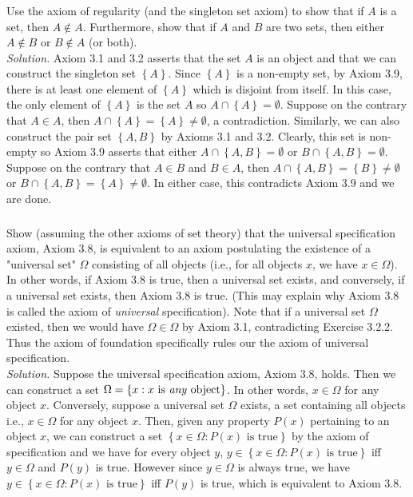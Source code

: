 \documentclass{amsart}
\theoremstyle{definition}
\newcommand{\soln}{\newline\textit{Solution.} }
\newcommand{\set}[1]{\left\{#1\right\}}
\begin{document}
\subsubsection{} Use the axiom of regularity (and the singleton set axiom) to show that if $A$ is a set, then $A\notin A$. Furthermore, show that if $A$ and $B$ are two sets, then either $A\notin B$ or $B\notin A$ (or both). \\
\soln Axiom 3.1 and 3.2 asserts that the set $A$ is an object and that we can construct the singleton set $\set{A}$. Since $\set{A}$ is a non-empty set, by Axiom 3.9, there is at least one element of $\set{A}$ which is disjoint from itself. In this case, the only element of $\set{A}$ is the set $A$ so $A\cap\set{A}=\emptyset$. Suppose on the contrary that $A\in A$, then $A\cap\set{A}=\set{A}\neq\emptyset$, a contradiction. Similarly, we can also construct the pair set $\set{A,B}$ by Axioms 3.1 and 3.2. Clearly, this set is non-empty so Axiom 3.9 asserts that either $A\cap\set{A,B}=\emptyset$ or $B\cap\set{A,B}=\emptyset$. Suppose on the contrary that $A\in B$ and $B\in A$, then $A\cap\set{A,B}=\set{B}\neq\emptyset$ or $B\cap\set{A,B}=\set{A}\neq\emptyset$. In either case, this contradicts Axiom 3.9 and we are done. \\


\subsubsection{} Show (assuming the other axioms of set theory) that the universal specification axiom, Axiom 3.8, is equivalent to an axiom postulating the existence of a "universal set" $\Omega$ consisting of all objects (i.e., for all objects $x$, we have $x\in\Omega$). In other words, if Axiom 3.8 is true, then a universal set exists, and conversely, if a universal set exists, then Axiom 3.8 is true. (This may explain why Axiom 3.8 is called the axiom of \textit{universal} specification). Note that if a universal set $\Omega$ existed, then we would have $\Omega\in\Omega$ by Axiom 3.1, contradicting Exercise 3.2.2. Thus the axiom of foundation specifically rules our the axiom of universal specification. \\
\soln Suppose the universal specification axiom, Axiom 3.8, holds. Then we can construct a set $\Omega=\set{x: x\text{ is \textit{any} object}}$. In other words, $x\in\Omega$ for any object $x$. Conversely, suppose a universal set $\Omega$ exists, a set containing all objects i.e., $x\in\Omega$ for any object $x$. Then, given any property $P(x)$ pertaining to an object $x$, we can construct a set $\set{x\in\Omega: P(x)\text{ is true}}$ by the axiom of specification and we have for every object $y$, $y\in\set{x\in\Omega: P(x)\text{ is true}}$ iff $y\in\Omega$ and $P(y)$ is true. However since $y\in\Omega$ is always true, we have $y\in\set{x\in\Omega: P(x)\text{ is true}}$ iff $P(y)$ is true, which is equivalent to Axiom 3.8. \\
\end{document}
